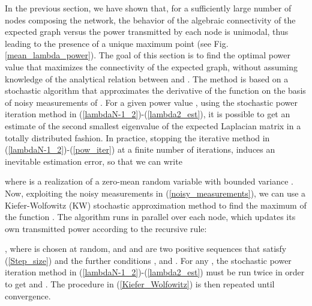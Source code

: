 \documentclass[10pt,twocolumn]{IEEEtran}
\begin{document}
 In the previous section, we have shown that, for a sufficiently large number of nodes composing the network, the behavior of the algebraic connectivity of the expected graph  versus the power  transmitted by each node is unimodal, thus leading to the presence of a unique maximum point (see Fig. \ref{mean_lambda_power}). The goal of this section is to find the optimal power value  that maximizes the connectivity of the expected graph, without assuming knowledge of the analytical relation between  and . The method is based on a stochastic algorithm that approximates the derivative of the function on the basis of noisy measurements of .
For a given power value , using the stochastic power iteration method in (\ref{lambdaN-1_2})-(\ref{lambda2_est}), it is possible to get an estimate  of the second smallest eigenvalue of the expected Laplacian matrix in a totally distributed fashion. In practice, stopping the iterative method  in (\ref{lambdaN-1_2})-(\ref{pow_iter}) at a finite number of iterations, induces an inevitable estimation error, so that we can write

where  is a realization of a zero-mean random variable with bounded variance .
Now, exploiting the noisy measurements in (\ref{noisy_measurements}), we can use a Kiefer-Wolfowitz (KW) stochastic approximation  method \cite{Nevel} to find the maximum of the function . The algorithm  runs in parallel over  each node, which updates its own transmitted power according to the recursive rule:

, where  is chosen at random, and  and  are two positive sequences that satisfy (\ref{Step_size}) and the further conditions
, and  .
For any , the stochastic power iteration method in (\ref{lambdaN-1_2})-(\ref{lambda2_est}) must be run twice in order to get  and . The procedure in (\ref{Kiefer_Wolfowitz}) is then repeated until convergence.
\end{document}
